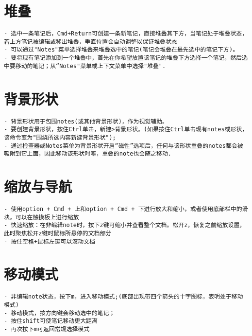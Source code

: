 \documentclass{../main.tex}{subfiles}
\begin{document}
\section{堆叠}
\begin{lstlisting}[style=lstCodeStylePlainText]
- 选中一条笔记后，Cmd+Return可创建一条新笔记，直接堆叠其下方，当笔记处于堆叠状态，若上方笔记被编辑或移出堆叠，垂直位置会自动调整以保证堆叠状态
- 可以通过"Notes"菜单选择堆叠来堆叠选中的笔记(笔记会堆叠在最先选中的笔记下方)。
- 要将现有笔记添加到一个堆叠中，首先在你希望放置该笔记的堆叠下方选择一个笔记，然后选中要移动的笔记；从“Notes"菜单或上下文菜单中选择"堆叠".
\end{lstlisting}

\section{背景形状}
\begin{lstlisting}[style=lstCodeStylePlainText, title={背景形状}]
- 背景形状用于包围notes(或其他背景形状)，作为视觉辅助。
- 要创建背景形状，按住Ctrl单击，新建>背景形状。(如果按住Ctrl单击现有notes或形状，该命令变为"围绕所选内容新建背景形状");
- 通过检查器或Notes菜单为背景形状开启“磁性”选项后，任何与该形状重叠的notes都会被吸附到它上面，因此移动该形状时嘛，重叠的note也会随之移动.
\end{lstlisting}

\section{缩放与导航}
\begin{lstlisting}[style=lstCodeStylePlainText,title={缩放与导航}]
- 使用option + Cmd + 上和option + Cmd + 下进行放大和缩小，或者使用底部栏中的滑块。可以在触摸板上进行缩放
- 快速缩放：在非编辑note时，按下z键可缩小并查看整个文档。松开z，恢复之前缩放设置，此时聚焦松开z键时鼠标所悬停的文档部分
- 按住空格+鼠标左键可以滚动文档
\end{lstlisting}

\section{移动模式}
\begin{lstlisting}[style=lstCodeStylePlainText,title={移动模式}]
- 非编辑note状态，按下m，进入移动模式;(底部出现带四个箭头的十字图标，表明处于移动模式)
- 移动模式，按方向键会移动选中的笔记；
- 按住shift可使笔记移动更大距离
- 再次按下m可返回常规选择模式
\end{lstlisting}

\end{document}
